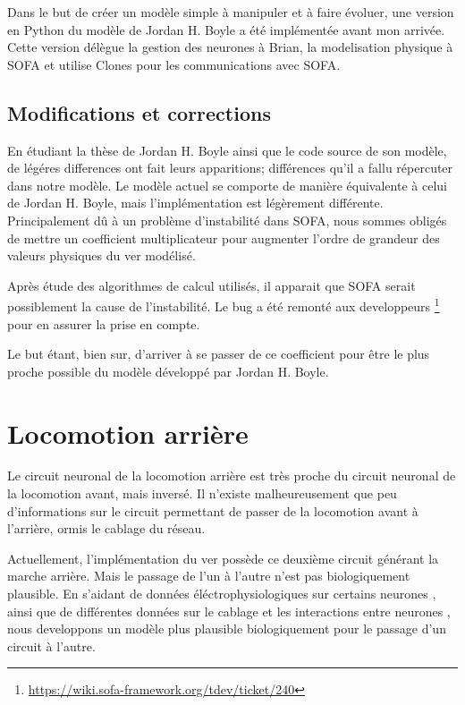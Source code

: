 Dans le but de créer un modèle simple à manipuler et à faire évoluer, une version en Python du
modèle de Jordan H. Boyle a été implémentée avant mon arrivée. Cette version délègue la gestion
des neurones à Brian, la modelisation physique à SOFA et utilise Clones pour les communications
avec SOFA.

\subsection{Modifications et corrections} %
\label{sub:Modifications et corrections}

En étudiant la thèse de Jordan H. Boyle ainsi que le code source de son modèle, de légéres differences
ont fait leurs apparitions; différences qu'il a fallu répercuter dans notre modèle.
Le modèle actuel se comporte de manière équivalente à celui de Jordan H. Boyle, mais l'implémentation
est légèrement différente. Principalement dû à un problème d'instabilité dans SOFA, nous sommes obligés
de mettre un coefficient multiplicateur pour augmenter l'ordre de grandeur des valeurs physiques du ver
modélisé.

Après étude des algorithmes de calcul utilisés, il apparait que SOFA serait possiblement la cause de
l'instabilité. Le bug a été remonté aux developpeurs
\footnote{\url{https://wiki.sofa-framework.org/tdev/ticket/240}} pour en assurer la prise en compte.

Le but étant, bien sur, d'arriver à se passer de ce coefficient pour être le plus proche possible
du modèle développé par Jordan H. Boyle.



\section{Locomotion arrière} %
\label{sec:Locomotion arrière}

Le circuit neuronal de la locomotion arrière est très proche du circuit neuronal de la locomotion
avant, mais inversé\cite{Boyle2009}. Il n'existe malheureusement que peu d'informations sur le circuit
permettant de passer de la locomotion avant à l'arrière, ormis le cablage du réseau.

Actuellement, l'implémentation du ver possède ce deuxième circuit générant la marche arrière. Mais
le passage de l'un à l'autre n'est pas biologiquement plausible. En s'aidant de données
éléctrophysiologiques sur certains neurones \cite{Mellem2008a,Lockery2009}, ainsi que de différentes
données sur le cablage et les interactions entre neurones
\cite{Chalfie1985,Gray2005,Chen2006,Varshney2011,Leifer2011}, nous developpons un modèle plus
plausible biologiquement pour le passage d'un circuit à l'autre.

